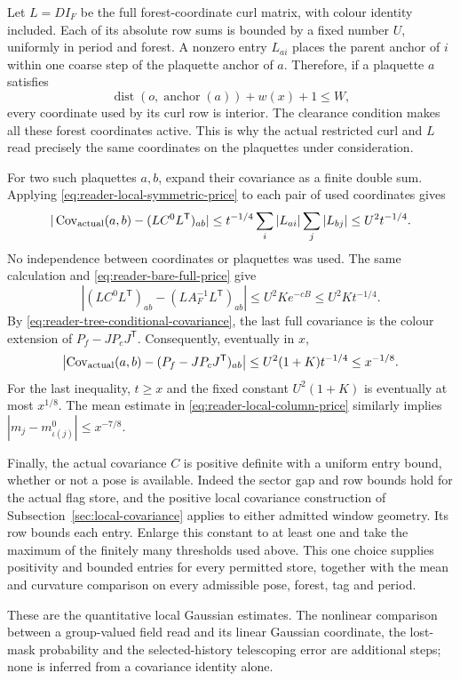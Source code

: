 Let $L=DI_F$ be the full forest-coordinate curl matrix, with colour
identity included. Each of its absolute row sums is bounded by a
fixed number $U$, uniformly in period and forest. A nonzero entry
$L_{ai}$ places the parent anchor of $i$ within one coarse step
of the plaquette anchor of $a$. Therefore, if a plaquette $a$
satisfies
\[
 \operatorname{dist}(o,\operatorname{anchor}(a))+w(x)+1\le W,
\]
every coordinate used by its curl row is interior. The clearance
condition makes all these forest coordinates active. This is why
the actual restricted curl and $L$ read precisely the same
coordinates on the plaquettes under consideration.

For two such plaquettes $a,b$, expand their covariance as a finite
double sum. Applying \eqref{eq:reader-local-symmetric-price} to
each pair of used coordinates gives
\[
 |\operatorname{Cov}_{\rm actual}(a,b)
                 -(LC^0L^{\mathsf T})_{ab}|
 \le t^{-1/4}\sum_i|L_{ai}|\sum_j|L_{bj}|
 \le U^2t^{-1/4}.
\]
No independence between coordinates or plaquettes was used.
The same calculation and \eqref{eq:reader-bare-full-price} give
\[
 |(LC^0L^{\mathsf T})_{ab}
                 -(LA_F^{-1}L^{\mathsf T})_{ab}|
 \le U^2Ke^{-cB}\le U^2Kt^{-1/4}.
\]
By \eqref{eq:reader-tree-conditional-covariance}, the last full
covariance is the colour extension of $P_f-JP_cJ^{\mathsf T}$.
Consequently, eventually in $x$,
\begin{equation}\label{eq:reader-strong-scope-price}
 \left|\operatorname{Cov}_{\rm actual}(a,b)
       -(P_f-JP_cJ^{\mathsf T})_{ab}\right|
 \le U^2(1+K)t^{-1/4}\le x^{-1/8}.
\end{equation}
For the last inequality, $t\ge x$ and the fixed constant
$U^2(1+K)$ is eventually at most $x^{1/8}$. The mean estimate
in \eqref{eq:reader-local-column-price} similarly implies
$|m_j-m^0_{\iota(j)}|\le x^{-7/8}$.

Finally, the actual covariance $C$ is positive definite with a
uniform entry bound, whether or not a pose is available. Indeed the
sector gap and row bounds hold for the actual flag store, and the
positive local covariance construction of
Subsection~\ref{sec:local-covariance} applies to either admitted window
geometry. Its row bounds each entry. Enlarge this constant to
at least one and take the maximum of the finitely many thresholds
used above. This one choice supplies positivity and bounded entries
for every permitted store, together with the mean and curvature
comparison on every admissible pose, forest, tag and period.

These are the quantitative local Gaussian estimates. The nonlinear
comparison between a group-valued field read and its linear Gaussian
coordinate, the lost-mask probability and the selected-history
telescoping error are additional steps; none is inferred from a
covariance identity alone.
